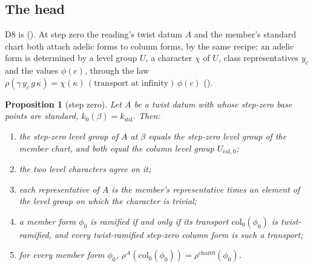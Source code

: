 \documentclass[11pt]{article}
\newcommand{\rT}{\rho}
\newtheorem{proposition}[theorem]{Proposition}
\theoremstyle{definition}
\theoremstyle{remark}
\begin{document}
\subsection{The head}
D8 is  (). At step zero the reading's twist datum $A$ and the member's standard chart  both attach adelic forms to column forms, by the same recipe: an adelic form is determined by a level group $U$, a character $\chi$ of $U$, class representatives $y_c$ and the values $\phi(c)$, through the law $\rT(\gamma\,y_c\,g\,\kappa)=\chi(\kappa)\,(\text{transport at infinity})\,\phi(c)$ ().

\begin{proposition}[step zero]\label{prop:D8}
Let $A$ be a twist datum with  whose step-zero base points are standard, $k_0(\beta)=k_{\mathrm{std}}$. Then:
\begin{enumerate}[label=(\roman*),itemsep=1pt]
\item the step-zero level group of $A$ at $\beta$ equals the step-zero level group of the member chart, and both equal the column level group $U_{\mathrm{col},0}$;
\item the two level characters agree on it;
\item each representative of $A$ is the member's representative times an element of the level group on which the character is trivial;
\item a member form $\phi_0$ is ramified if and only if its transport $\mathrm{col}_0(\phi_0)$ is twist-ramified, and every twist-ramified step-zero column form is such a transport;
\item for every member form $\phi_0$, $\rT^{A}(\mathrm{col}_0(\phi_0))=\rT^{\mathrm{chart0}}(\phi_0)$.
\end{enumerate}
\end{proposition}
\end{document}
